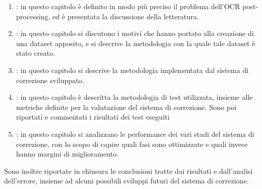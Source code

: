 \begin{enumerate}
\item \textbf{}: in questo capitolo è definito in modo più preciso il problema dell'OCR post-processing, ed è presentata la discussione della letteratura.

\item \textbf{}: in questo capitolo si discutono i motivi che hanno portato alla creazione di una dataset apposito, e si descrive la metodologia con la quale tale dataset è stato creato.

\item \textbf{}: in questo capitolo si descrive la metodologia implementata dal sistema di correzione sviluppato.


\item \textbf{}: in questo capitolo è descritta la metodologia di test utilizzata, insieme alle metriche definite per la valutazione del sistema di correzione. Sono poi riportati e commentati i risultati dei test eseguiti


\item \textbf{}: in questo capitolo si analizzano le performance dei vari stadi del sistema di correzione, con lo scopo di capire quali fasi sono ottimizzate e quali invece hanno margini di miglioramento.
\end{enumerate}
\noindent
Sono inoltre riportate in chiusura le conclusioni tratte dai risultati e dall'analisi dell'errore, insieme ad alcuni possibili sviluppi futuri del sistema di correzione.








